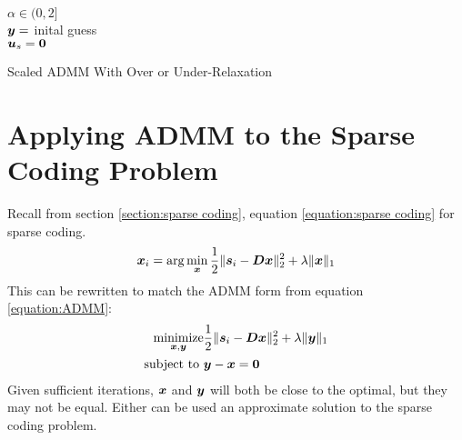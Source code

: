 \begin{algorithm}[H]
\SetAlgoLined
   $\alpha \in (0,2]$ \\
   $\bm{y} = $ inital guess \\
   $\bm{u}_s = \bm{0}$ \\
 \caption{Scaled ADMM With Over or Under-Relaxation}
\end{algorithm}


\section{Applying ADMM to the Sparse Coding Problem}
\label{section:Applying ADMM}
Recall from section \ref{section:sparse coding}, equation \ref{equation:sparse coding} for sparse coding.
%
\begin{equation}
\bm{x}_i = \arg\min_{\bm{x}} \frac{1}{2}\|\bm{s}_i - \bm{D}\bm{x}\|_2^2 + \lambda \|\bm{x}\|_1
\end{equation}
%
This can be rewritten to match the ADMM form from equation \ref{equation:ADMM}:
\begin{equation} \label{equation:SC Opt Prob}
\begin{aligned}
\operatorname*{\text{minimize}}_{\bm{x},\bm{y}} & \frac{1}{2} \|\bm{s}_i - \bm{D}\bm{x}\|_2^2 + \lambda\|\bm{y}\|_1 \\
         \text{subject to } & \bm{y} - \bm{x} = \bm{0}
\end{aligned}
\end{equation}
%
Given sufficient iterations, $\bm{x}$ and $\bm{y}$ will both be close to the optimal, but they may not be equal. Either can be used an approximate solution to the sparse coding problem.

